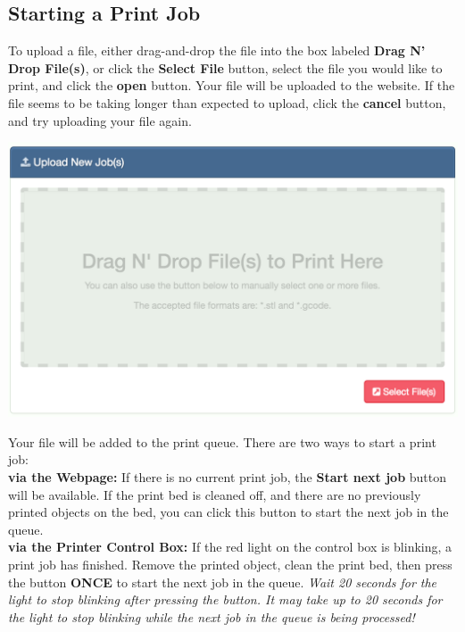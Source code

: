   \subsection{Starting a Print Job}
      To upload a file, either drag-and-drop the file into the box labeled \textbf{Drag N' Drop File(s)}, or
      click the \textbf{Select File} button, select the file you would like
      to print, and click the \textbf{open} button.  Your file will be uploaded to the website.  If the file seems to be taking longer than expected to upload, click the \textbf{cancel} button, and try uploading your file again.
      \begin{center}
      \includegraphics[scale=.3]{images/upload-job.png}
    \end{center}
	Your file will be added to the print queue.  There are two ways to start a print job:\\	
	\textbf{via the Webpage:} If there is no current print job, the \textbf{Start next job} button will be available.  If the print bed is cleaned off, and there are no previously printed objects on the bed, you can click this button to start the next job in the queue.\\
	\textbf{via the Printer Control Box:} If the red light on the control box is blinking, a print job has finished.  Remove the printed object, clean the print bed, then press the button \textbf{ONCE} to start the next job in the queue.  \emph{Wait 20 seconds for the light to stop blinking after pressing the button.  It may take up to 20 seconds for the light to stop blinking while the next job in the queue is being processed!} 

